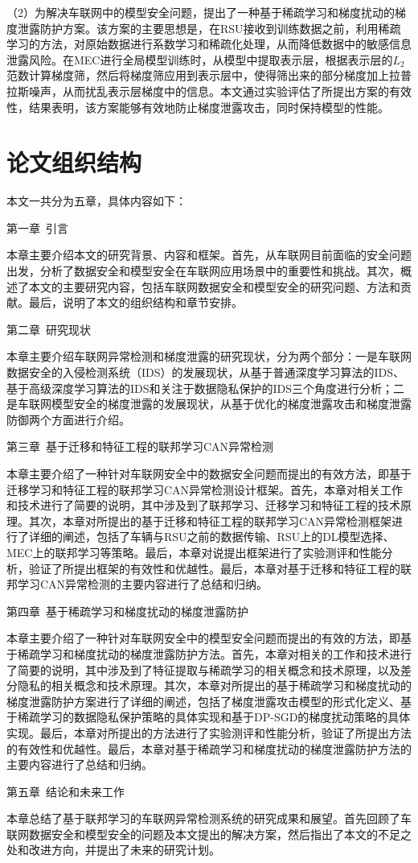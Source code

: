 （2）为解决车联网中的模型安全问题，提出了一种基于稀疏学习和梯度扰动的梯度泄露防护方案。该方案的主要思想是，在RSU接收到训练数据之前，利用稀疏学习的方法，对原始数据进行系数学习和稀疏化处理，从而降低数据中的敏感信息泄露风险。在MEC进行全局模型训练时，从模型中提取表示层，根据表示层的$L_2$范数计算梯度筛，然后将梯度筛应用到表示层中，使得筛出来的部分梯度加上拉普拉斯噪声，从而扰乱表示层梯度中的信息。本文通过实验评估了所提出方案的有效性，结果表明，该方案能够有效地防止梯度泄露攻击，同时保持模型的性能。

\section{论文组织结构}

本文一共分为五章，具体内容如下： 

第一章\ 引言

本章主要介绍本文的研究背景、内容和框架。首先，从车联网目前面临的安全问题出发，分析了数据安全和模型安全在车联网应用场景中的重要性和挑战。其次，概述了本文的主要研究内容，包括车联网数据安全和模型安全的研究问题、方法和贡献。最后，说明了本文的组织结构和章节安排。

第二章\  研究现状

本章主要介绍车联网异常检测和梯度泄露的研究现状，分为两个部分：一是车联网数据安全的入侵检测系统（IDS）的发展现状，从基于普通深度学习算法的IDS、基于高级深度学习算法的IDS和关注于数据隐私保护的IDS三个角度进行分析；二是车联网模型安全的梯度泄露的发展现状，从基于优化的梯度泄露攻击和梯度泄露防御两个方面进行介绍。

第三章\  基于迁移和特征工程的联邦学习CAN异常检测

本章主要介绍了一种针对车联网安全中的数据安全问题而提出的有效方法，即基于迁移学习和特征工程的联邦学习CAN异常检测设计框架。首先，本章对相关工作和技术进行了简要的说明，其中涉及到了联邦学习、迁移学习和特征工程的技术原理。其次，本章对所提出的基于迁移和特征工程的联邦学习CAN异常检测框架进行了详细的阐述，包括了车辆与RSU之前的数据传输、RSU上的DL模型选择、MEC上的联邦学习等策略。最后，本章对说提出框架进行了实验测评和性能分析，验证了所提出框架的有效性和优越性。最后，本章对基于迁移和特征工程的联邦学习CAN异常检测的主要内容进行了总结和归纳。

第四章\  基于稀疏学习和梯度扰动的梯度泄露防护 

本章主要介绍了一种针对车联网安全中的模型安全问题而提出的有效的方法，即基于稀疏学习和梯度扰动的梯度泄露防护方法。首先，本章对相关的工作和技术进行了简要的说明，其中涉及到了特征提取与稀疏学习的相关概念和技术原理，以及差分隐私的相关概念和技术原理。其次，本章对所提出的基于稀疏学习和梯度扰动的梯度泄露防护方案进行了详细的阐述，包括了梯度泄露攻击模型的形式化定义、基于稀疏学习的数据隐私保护策略的具体实现和基于DP-SGD的梯度扰动策略的具体实现。最后，本章对所提出的方法进行了实验测评和性能分析，验证了所提出方法的有效性和优越性。最后，本章对基于稀疏学习和梯度扰动的梯度泄露防护方法的主要内容进行了总结和归纳。

第五章\  结论和未来工作 

本章总结了基于联邦学习的车联网异常检测系统的研究成果和展望。首先回顾了车联网数据安全和模型安全的问题及本文提出的解决方案，然后指出了本文的不足之处和改进方向，并提出了未来的研究计划。
